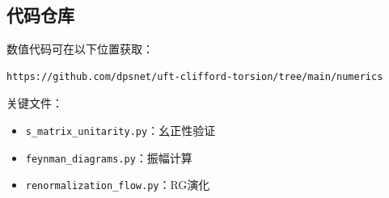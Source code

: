 \subsection{代码仓库}

数值代码可在以下位置获取：
\begin{verbatim}
https://github.com/dpsnet/uft-clifford-torsion/tree/main/numerics
\end{verbatim}

关键文件：
\begin{itemize}
    \item \texttt{s\_matrix\_unitarity.py}：幺正性验证
    \item \texttt{feynman\_diagrams.py}：振幅计算
    \item \texttt{renormalization\_flow.py}：RG演化
\end{itemize}
